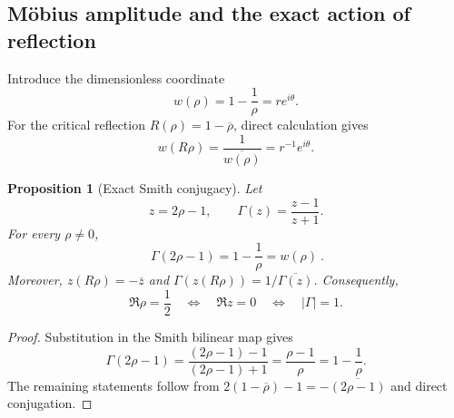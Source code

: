 \documentclass[11pt]{amsart}
\newtheorem{proposition}[theorem]{Proposition}
\theoremstyle{definition}
\theoremstyle{remark}
\begin{document}
\subsection{M\"obius amplitude and the exact action of reflection}
Introduce the dimensionless coordinate
\begin{equation}\label{eq:wcoord}
 w(\rho)=1-\frac1\rho=re^{i\theta}.
\end{equation}
For the critical reflection $R(\rho)=1-\overline\rho$, direct calculation gives
\begin{equation}\label{eq:wreflection}
 w(R\rho)=\frac1{\overline{w(\rho)}}=r^{-1}e^{i\theta}.
\end{equation}
\begin{proposition}[Exact Smith conjugacy]\label{prop:smith-conjugacy}
Let
\begin{equation}\label{eq:smith-centered-coordinate}
 z=2\rho-1,
 \qquad
 \Gamma(z)=\frac{z-1}{z+1}.
\end{equation}
For every $\rho\ne0$,
\begin{equation}\label{eq:smith-keiper-li-identity}
 \boxed{\ \Gamma(2\rho-1)=1-\frac1\rho=w(\rho)\ }.
\end{equation}
Moreover, $z(R\rho)=-\overline z$ and
$\Gamma(z(R\rho))=1/\overline{\Gamma(z)}$.  Consequently,
\begin{equation}\label{eq:smith-critical-boundary}
 \Re\rho=\frac12
 \quad\Longleftrightarrow\quad
 \Re z=0
 \quad\Longleftrightarrow\quad
 |\Gamma|=1.
\end{equation}
\end{proposition}
\begin{proof}
Substitution in the Smith bilinear map gives
\[
 \Gamma(2\rho-1)
 =\frac{(2\rho-1)-1}{(2\rho-1)+1}
 =\frac{\rho-1}{\rho}
 =1-\frac1\rho.
\]
The remaining statements follow from
$2(1-\overline\rho)-1=-\overline{(2\rho-1)}$ and direct conjugation.
\end{proof}
\end{document}
